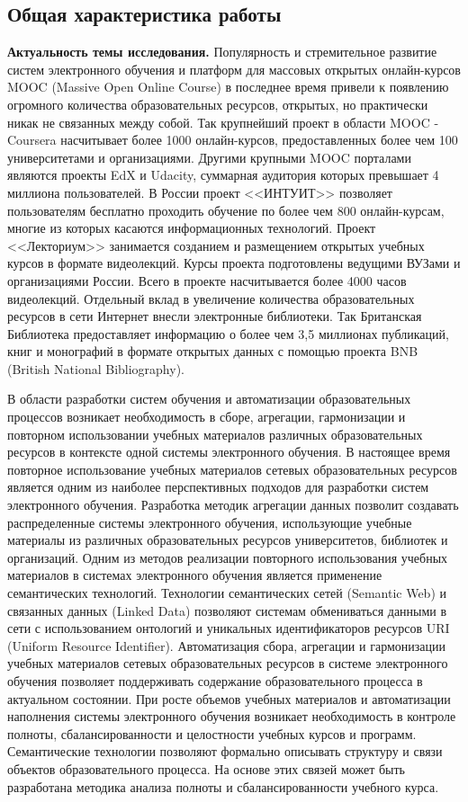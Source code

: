 \subsection*{\Large Общая характеристика работы}
\fontsize{14pt}{15pt}\selectfont


\textbf{Актуальность темы исследования.}
Популярность и стремительное развитие систем электронного обучения и платформ для массовых открытых онлайн-курсов MOOC (Massive Open Online Course) в последнее время привели к появлению огромного количества образовательных ресурсов, открытых, но практически никак не связанных между собой. Так крупнейший проект в области MOOC - Coursera насчитывает более 1000 онлайн-курсов, предоставленных более чем 100 университетами и организациями. Другими крупными MOOC порталами являются проекты EdX и Udacity, суммарная аудитория которых превышает 4 миллиона пользователей. В России проект <<ИНТУИТ>> позволяет пользователям бесплатно проходить обучение по более чем 800 онлайн-курсам, многие из которых касаются информационных технологий. Проект <<Лекториум>> занимается созданием и размещением открытых учебных курсов в формате видеолекций. Курсы проекта подготовлены ведущими ВУЗами и организациями России. Всего в проекте насчитывается более 4000 часов видеолекций. Отдельный вклад в увеличение количества образовательных ресурсов в сети Интернет внесли электронные библиотеки. Так Британская Библиотека предоставляет информацию о более чем 3,5 миллионах публикаций, книг и монографий в формате открытых данных с помощью проекта BNB (British National Bibliography). 

В области разработки систем обучения и автоматизации образовательных процессов возникает необходимость в сборе, агрегации, гармонизации и повторном использовании учебных материалов различных образовательных ресурсов в контексте одной системы электронного обучения. В настоящее время повторное использование учебных материалов сетевых образовательных ресурсов является одним из наиболее перспективных подходов для разработки систем электронного обучения. Разработка методик агрегации данных позволит создавать распределенные системы электронного обучения, использующие учебные материалы из различных образовательных ресурсов университетов, библиотек и организаций. Одним из методов реализации повторного использования учебных материалов в системах электронного обучения является применение семантических технологий. Технологии семантических сетей (Semantic Web) и связанных данных (Linked Data) позволяют системам обмениваться данными в сети с использованием онтологий и уникальных идентификаторов ресурсов URI (Uniform Resource Identifier). Автоматизация сбора, агрегации и гармонизации учебных материалов сетевых образовательных ресурсов в системе электронного обучения позволяет поддерживать содержание образовательного процесса в актуальном состоянии. При росте объемов учебных материалов и автоматизации наполнения системы электронного обучения возникает необходимость в контроле полноты, сбалансированности и целостности учебных курсов и программ. Семантические технологии позволяют формально описывать структуру и связи объектов образовательного процесса. На основе этих связей может быть разработана методика анализа полноты и сбалансированности учебного курса. 


